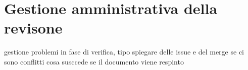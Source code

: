 \section{Gestione amministrativa della revisone}
gestione problemi in fase di verifica, tipo spiegare delle issue e del merge se ci sono conflitti cosa susccede se il documento viene respinto